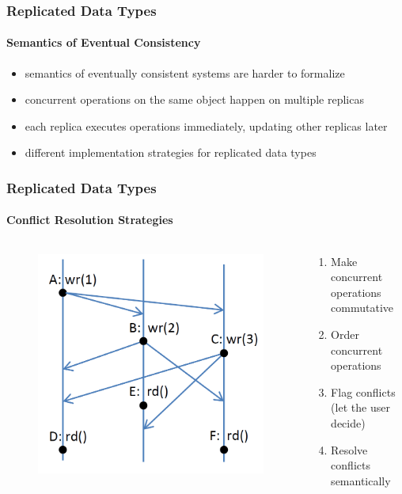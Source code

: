\documentclass[11pt]{beamer}
\begin{document}
\begin{frame}
\frametitle{Replicated Data Types}
\framesubtitle{Semantics of Eventual Consistency}
\begin{itemize}
\item semantics of eventually consistent systems are harder to formalize
\item concurrent operations on the same object happen on multiple replicas
\item each replica executes operations immediately, updating other replicas later
\item different implementation strategies for replicated data types
\end{itemize}
\end{frame}

\begin{frame}
\frametitle{Replicated Data Types}
\framesubtitle{Conflict Resolution Strategies}
\begin{columns}
\begin{column}{5cm}
\begin{figure}
\includegraphics[scale=0.3]{update_replicas_highres.png}
\end{figure}
\end{column}
\begin{column}{5cm}
\pause
\begin{enumerate}
\item Make concurrent operations commutative
\pause
\item Order concurrent operations
\pause
\item Flag conflicts (let the user decide)
\pause
\item Resolve conflicts semantically
\end{enumerate}
\end{column}
\end{columns}
\end{frame}
\end{document}
